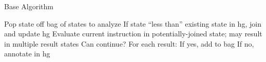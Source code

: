 %
%
%

\begin{frame}{Base Algorithm}
  \begin{outline}[enumerate]
    \1<+-> Pop state off \gls{bag} of states to analyze
    \1<+-> If state \alert{``less than''} existing state in \gls{hg}, join and update \gls{hg}
    \1<+-> Evaluate current instruction in potentially-joined state; may result in multiple result states
    \1<+-> Can continue? For each result:
      \2 If yes, add to bag
      \2 If no, annotate in \gls{hg}
  \end{outline}
\end{frame}

